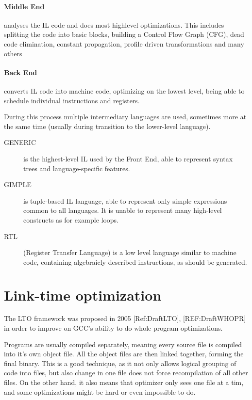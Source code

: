 \paragraph{Middle End} analyses the IL code and does most highlevel
optimizations. This includes splitting the code into basic blocks, building a
Control Flow Graph (CFG), dead code elimination, constant propagation, profile
driven transformations and many others 

\paragraph{Back End} converts IL code into machine code, optimizing on the
lowest level, being able to schedule individual instructions and registers.

During this process multiple intermediary languages are used, sometimes more at
the same time (usually during transition to the lower-level language).

\begin{description}
	\item[GENERIC] is the highest-level IL used by the Front End, able to
		represent syntax trees and language-specific features.
	\item[GIMPLE] is tuple-based IL language, able to represent only simple
		expressions common to all languages. It is unable to represent many
		high-level constructs as for example loops.
	\item[RTL] (Register Transfer Language) is a low level language similar to
		machine code, containing algebraicly described instructions, as should
		be generated.
\end{description}


\section{Link-time optimization}

The LTO framework was proposed in 2005 [Ref:DraftLTO], [REF:DraftWHOPR] in
order to improve on GCC's ability to do whole program optimizations.

Programs are usually compiled separately, meaning every source file is compiled
into it's own object file. All the object files are then linked together,
forming the final binary. This is a good technique, as it not only allows
logical grouping of code into files, but also change in one file does not force
recompilation of all other files. On the other hand, it also means that
optimizer only sees one file at a tim, and some optimizations might be hard or
even impossible to do.

